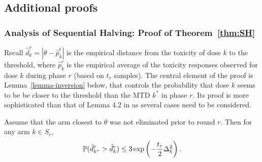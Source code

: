 
\subsection{Additional proofs}
\subsubsection{Analysis of Sequential Halving: Proof of Theorem~\ref{thm:SH}}
\label{sec:SHproof}

Recall $\hat{d}_k^r = |\theta - \hat{p}_k^t|$ is the empirical distance from the toxicity of dose $k$ to the threshold, where $\hat{p}_k^r$ is the empirical average of the toxicity responses observed for dose $k$ during phase $r$ (based on $t_r$ samples). The central element of the proof is Lemma~\ref{lemma-inversion} below, that controls the probability that dose $k$ seems to be be closer to the threshold than the MTD $k^*$ in phase $r$. Its proof is more sophisticated than that of Lemma 4.2 in \cite{icml2013_karnin13} as several cases need to be considered. 
%
%
\begin{lemma}
\label{lemma-inversion}
Assume that the arm closest to $\theta$ was not eliminated
prior to round $r$.
Then for any arm $k \in S_r$,
\begin{equation}\mathbb{P}(\hat{d}^r_{k^*} > \hat{d}^r_k) \leq 3 \exp\left(- \frac{t_r}{2}\Delta_k^2\right).\label{toproofin4case}\end{equation}
\end{lemma}
%
%
